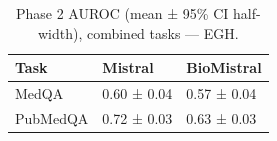 \begin{table}
\caption{Phase 2 AUROC (mean ± 95\% CI half-width), combined tasks — EGH.}
\label{tab:phase2_auroc_all_egh_probe_oof}
\begin{tabular}{lll}
\toprule
Task & Mistral & BioMistral \\
\midrule
MedQA & 0.60 ± 0.04 & 0.57 ± 0.04 \\
PubMedQA & 0.72 ± 0.03 & 0.63 ± 0.03 \\
\bottomrule
\end{tabular}
\end{table}
